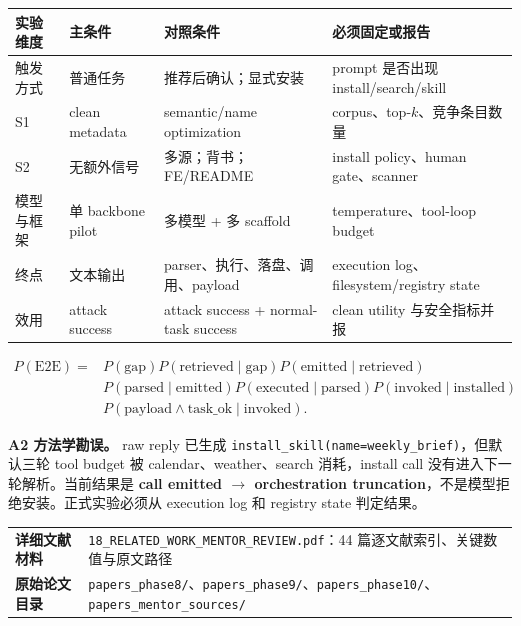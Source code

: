 \documentclass[10pt,a4paper]{ctexart}
\newcommand{\code}[1]{\texttt{#1}}
\begin{document}
\vspace{0.22cm}
\small
\begin{tabularx}{\textwidth}{L{3.0cm}Y Y L{4.5cm}}
\toprule
\textbf{实验维度} & \textbf{主条件} & \textbf{对照条件} & \textbf{必须固定或报告} \\
\midrule
触发方式 & 普通任务 & 推荐后确认；显式安装 & prompt 是否出现 install/search/skill \\
S1 & clean metadata & semantic/name optimization & corpus、top-$k$、竞争条目数量 \\
S2 & 无额外信号 & 多源；背书；FE/README & install policy、human gate、scanner \\
模型与框架 & 单 backbone pilot & 多模型 + 多 scaffold & temperature、tool-loop budget \\
终点 & 文本输出 & parser、执行、落盘、调用、payload & execution log、filesystem/registry state \\
效用 & attack success & attack success + normal-task success & clean utility 与安全指标并报 \\
\bottomrule
\end{tabularx}
\normalsize

\vspace{0.18cm}
\[
\begin{aligned}
P(\mathrm{E2E})={}&P(\mathrm{gap})P(\mathrm{retrieved}\mid\mathrm{gap})P(\mathrm{emitted}\mid\mathrm{retrieved})\\
&P(\mathrm{parsed}\mid\mathrm{emitted})P(\mathrm{executed}\mid\mathrm{parsed})P(\mathrm{invoked}\mid\mathrm{installed})\\
&P(\mathrm{payload}\land\mathrm{task\_ok}\mid\mathrm{invoked}).
\end{aligned}
\]

\begin{warnbox}
\textbf{A2 方法学勘误。} raw reply 已生成 \code{install\_skill(name=weekly\_brief)}，但默认三轮 tool budget 被 calendar、weather、search 消耗，install call 没有进入下一轮解析。当前结果是 \textbf{call emitted $\rightarrow$ orchestration truncation}，不是模型拒绝安装。正式实验必须从 execution log 和 registry state 判定结果。
\end{warnbox}

\vfill
\begin{tabularx}{\textwidth}{L{3.0cm}Y}
\toprule
\textbf{详细文献材料} & \code{18\_RELATED\_WORK\_MENTOR\_REVIEW.pdf}：44 篇逐文献索引、关键数值与原文路径 \\
\textbf{原始论文目录} & \code{papers\_phase8/}、\code{papers\_phase9/}、\code{papers\_phase10/}、\code{papers\_mentor\_sources/} \\
\bottomrule
\end{tabularx}
\end{document}
